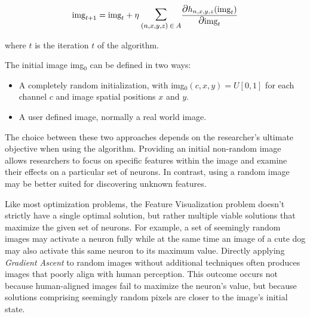 \begin{equation}
    \text{img}_{t + 1} = \text{img}_t + \eta \: \mathlarger{\mathlarger{\sum}}_{(n, x, y, z) \: \in \: A} \frac{\mathlarger{\mathlarger{\partial}} h_{n, x, y, z} (\text{img}_t)}{\mathlarger{\mathlarger{\partial}} \text{img}_t}
    \label{eq:feat_vis_formula}
\end{equation}

\noindent where \(t\) is the iteration \(t\) of the algorithm. 

The initial image img\(_0\) can be defined in two ways:

\begin{itemize}
    \item A completely random initialization, with img\(_0(c, x, y) = U[0, 1]\) for each channel \(c\) and image spatial positions \(x\) and \(y\).
    \item A user defined image, normally a real world image.
\end{itemize}

The choice between these two approaches depends on the researcher's ultimate objective when using the algorithm.
Providing an initial non-random image allows researchers to focus on specific features within the image and examine their effects on a particular set of neurons. 
In contrast, using a random image may be better suited for discovering unknown features.

Like most optimization problems, the Feature Visualization problem doesn't strictly have a single optimal solution, but rather multiple viable solutions that maximize the given set of neurons.
For example, a set of seemingly random images may activate a neuron fully while at the same time an image of a cute dog may also activate this same neuron to its maximum value.
Directly applying \emph{Gradient Ascent} to random images without additional techniques often produces images that poorly align with human perception. This outcome occurs not because human-aligned images fail to maximize the neuron's value, but because solutions comprising seemingly random pixels are closer to the image's initial state.

